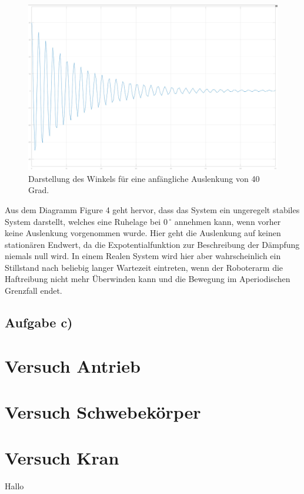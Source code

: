 \documentclass[11pt]{scrartcl}
\begin{document}
\begin{figure}[H]
	\centering
	\includegraphics[width=1\textwidth]{WinkelanzeigeinGrad3b.jpeg}
	\caption{Darstellung des Winkels für eine anfängliche Auslenkung von 40 Grad. }
	\label{img:grafik-dummy}
\end{figure}
Aus dem Diagramm Figure 4 geht hervor, dass das System ein ungeregelt stabiles System darstellt, welches eine Ruhelage bei 0\,$^\circ$ annehmen kann, wenn vorher keine Auslenkung vorgenommen wurde. Hier geht die Auslenkung auf keinen stationären Endwert, da die Expotentialfunktion zur Beschreibung der Dämpfung niemals null wird. In einem Realen System wird hier aber wahrscheinlich ein Stillstand nach beliebig langer Wartezeit eintreten, wenn der Roboterarm die Haftreibung nicht mehr Überwinden kann und die Bewegung im Aperiodischen Grenzfall endet.

\subsection{Aufgabe c)}





\section{Versuch Antrieb}

\section{Versuch Schwebekörper}

\section{Versuch Kran}

Hallo
\end{document}
